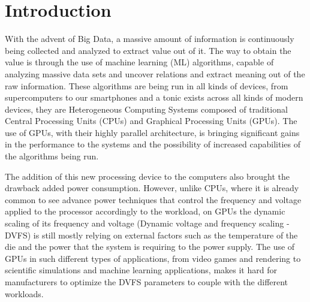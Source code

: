 
\chapter{Introduction}
\label{chapter:introduction}

With the advent of Big Data, a massive amount of information is continuously being collected and analyzed to extract value out of it. The way to obtain the value is through the use of machine learning (ML) algorithms, capable of analyzing massive data sets and uncover relations and extract meaning out of the raw information. These algorithms are being run in all kinds of devices, from supercomputers to our smartphones and a tonic exists across all kinds of modern devices, they are Heterogeneous Computing Systems composed of traditional Central Processing Units (CPUs) and Graphical Processing Units (GPUs). The use of GPUs, with their highly parallel architecture, is bringing significant gains in the performance to the systems and the possibility of increased capabilities of the algorithms being run. 

The addition of this new processing device to the computers also brought the drawback added power consumption. However, unlike CPUs, where it is already common to see advance power techniques that control the frequency and voltage applied to the processor accordingly to the workload, on GPUs the dynamic scaling  of its frequency and voltage (Dynamic voltage and frequency scaling - DVFS) is still mostly relying on external factors such as the temperature of the die and the power that the system is requiring to the power supply. The use of GPUs in such different types of applications, from video games and rendering to scientific simulations and machine learning applications, makes it hard for manufacturers to optimize the DVFS parameters to couple with the different workloads.

